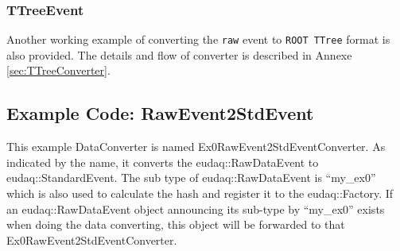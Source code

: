 \subsubsection{TTreeEvent}
\label{sec:RawEvent2TTreeEventConverter}

Another working example of converting the \texttt{raw} event to \texttt{ROOT TTree} format is also provided. The details and flow of converter is described in Annexe \ref{sec:TTreeConverter}.



\subsection{Example Code: RawEvent2StdEvent}\label{sec:Ex0RawEvent2StdEventConverter_cc}
This example DataConverter is named Ex0RawEvent2StdEventConverter. As indicated by the name, it converts the eudaq::RawDataEvent to eudaq::StandardEvent. The sub type of eudaq::RawDataEvent is ``my\_ex0'' which is also used to calculate the hash and register it to the eudaq::Factory. If an eudaq::RawDataEvent object announcing its sub-type by ``my\_ex0'' exists when doing the data converting, this object will be forwarded to that Ex0RawEvent2StdEventConverter.





 
